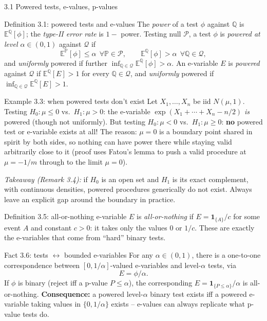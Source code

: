 \documentclass[aspectratio=169,10pt]{beamer}
\newcommand{\PP}{\mathbb{P}}
\newcommand{\QQ}{\mathbb{Q}}
\newcommand{\EE}{\mathbb{E}}
\newcommand{\calP}{\mathcal{P}}
\newcommand{\calQ}{\mathcal{Q}}
\newcommand{\indic}[1]{\mathbf{1}_{\{#1\}}}
\begin{document}
\begin{frame}[allowframebreaks]{3.1 Powered tests, e-values, p-values}
  \begin{block}{Definition 3.1: powered tests and e-values}
    The \emph{power} of a test $\phi$ against $\QQ$ is $\EE^\QQ[\phi]$; the \emph{type-II error rate} is $1-$ power. Testing null $\calP$, a test $\phi$ is \emph{powered at level $\alpha\in(0,1)$} against $\calQ$ if
    \[
      \EE^\PP[\phi]\le \alpha \ \ \forall \PP\in\calP, \qquad \EE^\QQ[\phi]>\alpha \ \ \forall \QQ\in\calQ,
    \]
    and \emph{uniformly} powered if further $\inf_{\QQ\in\calQ}\EE^\QQ[\phi]>\alpha$. An e-variable $E$ is \emph{powered} against $\calQ$ if $\EE^\QQ[E]>1$ for every $\QQ\in\calQ$, and \emph{uniformly} powered if $\inf_{\QQ\in\calQ}\EE^\QQ[E]>1$.
  \end{block}

  \begin{exampleblock}{Example 3.3: when powered tests don't exist}
    Let $X_1,\dots,X_n$ be iid $N(\mu,1)$. Testing $H_0:\mu\le 0$ vs.\ $H_1:\mu>0$: the e-variable $\exp(X_1+\cdots+X_n-n/2)$ \emph{is} powered (though not uniformly). But testing $H_0:\mu<0$ vs.\ $H_1:\mu\ge 0$: \textbf{no} powered test or e-variable exists at all! The reason: $\mu=0$ is a boundary point shared in spirit by both sides, so nothing can have power there while staying valid arbitrarily close to it (proof uses Fatou's lemma to push a valid procedure at $\mu=-1/m$ through to the limit $\mu=0$).

    \emph{Takeaway (Remark 3.4):} if $H_0$ is an open set and $H_1$ is its exact complement, with continuous densities, powered procedures generically do not exist. Always leave an explicit gap around the boundary in practice.
  \end{exampleblock}

  \begin{block}{Definition 3.5: all-or-nothing e-variable}
    $E$ is \emph{all-or-nothing} if $E=\indic{A}/c$ for some event $A$ and constant $c>0$: it takes only the values $0$ or $1/c$. These are exactly the e-variables that come from ``hard'' binary tests.
  \end{block}

  \begin{block}{Fact 3.6: tests $\leftrightarrow$ bounded e-variables}
    For any $\alpha\in(0,1)$, there is a one-to-one correspondence between $[0,1/\alpha]$-valued e-variables and level-$\alpha$ tests, via
    \[
      E = \phi/\alpha.
    \]
    If $\phi$ is binary (reject iff a p-value $P\le\alpha$), the corresponding $E=\indic{P\le\alpha}/\alpha$ is all-or-nothing. \textbf{Consequence:} a powered level-$\alpha$ binary test exists iff a powered e-variable taking values in $\{0,1/\alpha\}$ exists -- e-values can always replicate what p-value tests do.
  \end{block}


\end{frame}
\end{document}
